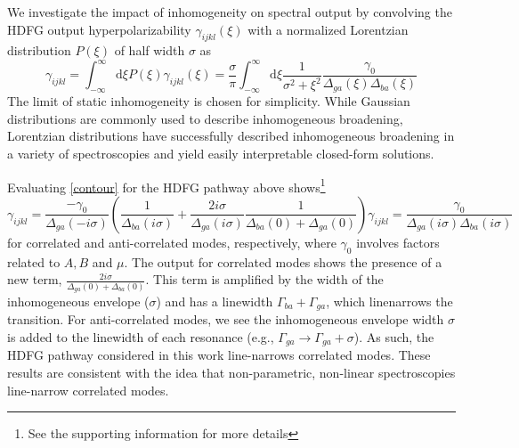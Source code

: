 \documentclass[aip, jcp, reprint, onecolumn, nofootinbib]{revtex4-2}
\begin{document}
We investigate the impact of inhomogeneity on spectral output by convolving the HDFG output hyperpolarizability $\gamma_{ijkl}(\xi)$ with a normalized Lorentzian distribution $P(\xi)$ of half width $\sigma$ as \cite{Penner1976, Desiderio1979, Dick83_1, Carlson1990line} 
\begin{equation}\label{contour}
	\gamma_{ijkl} = \int_{-\infty}^\infty \mathrm{d}\xi P(\xi) \gamma_{ijkl}(\xi)
	= \frac{\sigma}{\pi}\int_{-\infty}^\infty \mathrm{d}\xi \frac{1}{\sigma^2 + \xi^2} \frac{\gamma_0}{\Delta_{ga}(\xi)\Delta_{ba}(\xi)}
\end{equation} 
The limit of static inhomogeneity is chosen for simplicity.
While Gaussian distributions are commonly used to describe inhomogeneous broadening, Lorentzian distributions have successfully described inhomogeneous broadening in a variety of spectroscopies and yield easily interpretable closed-form solutions. \cite{Dick83_1, Carlson1990line, RN410, Yurs2011, Yurs2012}

Evaluating \autoref{contour} for the HDFG pathway above shows\footnote{See the supporting information for more details} 
\begin{subequations}\label{linenarrow}
	\begin{equation}\label{linenarrowa}
		\gamma_{ijkl} = \frac{- \gamma_0}{\Delta_{ga}(- i \sigma)} \left( \frac{1}{\Delta_{ba}(i \sigma)} + \frac{2 i \sigma}{\Delta_{ga}(i \sigma)} \frac{1}{\Delta_{ba}(0) + \Delta_{ga}(0)} \right)
	\end{equation}
	\begin{equation}
		\gamma_{ijkl} = \frac{\gamma_0}{\Delta_{ga}(i\sigma)\Delta_{ba}(i \sigma)}
	\end{equation}
\end{subequations}
for correlated and anti-correlated modes, respectively, where $\gamma_0$ involves factors related to $A,B$ and $\mu$.
The output for correlated modes shows the presence of a new term, $\frac{2i\sigma}{\Delta_{ga}(0) + \Delta_{ba}(0)}$. 
This term is amplified by the width of the inhomogeneous envelope ($\sigma$) and has a linewidth $\Gamma_{ba} + \Gamma_{ga}$, which linenarrows the transition. 
For anti-correlated modes, we see the inhomogeneous envelope width $\sigma$ is added to the linewidth of each resonance (e.g., $\Gamma_{ga} \rightarrow \Gamma_{ga} + \sigma$).
As such, the HDFG pathway considered in this work line-narrows correlated modes. 
These results are consistent with the idea that non-parametric, non-linear spectroscopies line-narrow correlated modes. \cite{Dick83_1, Carlson1990line}
\end{document}
